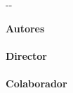 {\begin{cambiamargen}{-\cambioIzquierdo}{-\cambioDerecho}
\begin{center}
\end{center}

\vfill

\begin{large}
\begin{center}
{\Large \bfseries Autores}\\
\textbf{\autorPortadaVal}\\[0.5cm]
{\Large \bfseries Director}\\
\textbf{\directorPortadaVal}\\[0.5cm]
\ifx\colaboradorPortadaVal\empty
\else
{\Large \bfseries Colaborador}\\
\textbf{\colaboradorPortadaVal}\\[0.5cm]
\fi
\textbf{\institucionVal}\\[1em]
\end{center}
\end{large}

\vfill

\end{cambiamargen}

\newpage

\thispagestyle{empty}
\mbox{ }


\newpage

\thispagestyle{empty}

\mbox{ }

\begin{Huge}
\begin{center}
\tituloPortadaVal \\
\tituloPortadaEngVal
\end{center}
\end{Huge}

}
